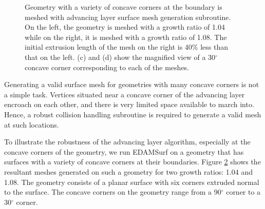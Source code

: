 \begin{figure}
\begin{subfigure}{0.5\textwidth}
		\caption{}
		\label{fig-variousAngle-corner-high}
	\end{subfigure}
	\caption[EdamSurf mesh of a geometry with plenty of concave corners (robustness test case 1).]{Geometry with a variety of concave corners at the boundary is meshed with advancing layer surface mesh generation subroutine. On the left, the geometry is meshed with a growth ratio of 1.04 while on the right, it is meshed with a growth ratio of 1.08. The initial extrusion length of the mesh on the right is 40\% less than that on the left. (c) and (d) show the magnified view of a 30$^\circ$ concave corner corresponding to each of the meshes.}
	\label{fig-variousAngle}
\end{figure}

Generating a valid surface mesh for geometries with many concave corners is not a simple task. Vertices situated near a concave corner of the advancing layer encroach on each other, and there is very limited space available to march into. Hence, a robust collision handling subroutine is required to generate a valid mesh at such locations.

To illustrate the robustness of the advancing layer algorithm, especially at the concave corners of the geometry, we run EDAMSurf on a geometry that has surfaces with a variety of concave corners at their boundaries. Figure \ref{fig-variousAngle} shows the resultant meshes generated on such a geometry for two growth ratios: 1.04 and 1.08. The geometry consists of a planar surface with six corners extruded normal to the surface. The concave corners on the geometry range from a 90$^\circ$ corner to a 30$^\circ$ corner.

